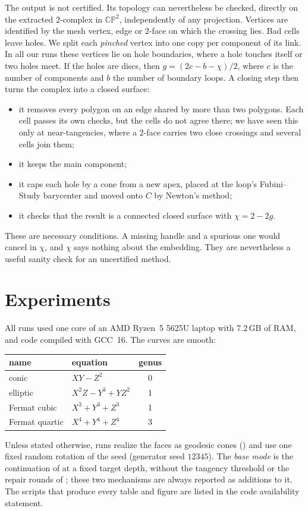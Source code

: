 \documentclass[11pt]{article}
\theoremstyle{plain}
\theoremstyle{definition}
\theoremstyle{remark}
\newcommand{\CP}{\mathbb{CP}}
\begin{document}
The output is not certified. Its topology can nevertheless be checked,
directly on the extracted $2$-complex in $\CP^2$, independently of any
projection. Vertices are identified by the mesh vertex, edge or $2$-face
on which the crossing lies. Bad cells leave holes. We split each
\emph{pinched} vertex into one copy per component of its link. In all our
runs these vertices lie on hole boundaries, where a hole touches itself
or two holes meet. If the holes are discs, then
$g=(2c-b-\chi)/2$, where $c$ is the number of components and $b$ the number
of boundary loops. A closing step then turns the complex into a closed
surface:
\begin{itemize}[itemsep=1pt]
\item it removes every polygon on an edge shared by more than two
  polygons. Each cell passes its own checks, but the cells do not agree
  there; we have seen this only at near-tangencies, where a $2$-face
  carries two close crossings and several cells join them;
\item it keeps the main component;
\item it caps each hole by a cone from a new apex, placed at the loop's
  Fubini--Study barycenter and moved onto $C$ by Newton's method;
\item it checks that the result is a connected closed surface with
  $\chi=2-2g$.
\end{itemize}
These are necessary conditions. A missing handle and a spurious one would
cancel in $\chi$, and $\chi$ says nothing about the embedding. They are
nevertheless a useful sanity check for an uncertified method.

\section{Experiments}
\label{sec:experiments}

All runs used one core of an AMD Ryzen~5 5625U laptop with $7.2$\,GB of
RAM, and code compiled with GCC~16. The curves are smooth:
\begin{center}
\small
\begin{tabular}{@{}llc@{}}
\toprule
name & equation & genus \\
\midrule
conic & $XY-Z^2$ & 0 \\
elliptic & $X^2Z-Y^3+YZ^2$ & 1 \\
Fermat cubic & $X^3+Y^3+Z^3$ & 1 \\
Fermat quartic & $X^4+Y^4+Z^4$ & 3 \\
\bottomrule
\end{tabular}
\end{center}
Unless stated otherwise, runs realize the faces as geodesic cones
() and use one fixed random rotation of the seed
(generator seed $12345$). The \emph{base mode} is the continuation of
 at a fixed target depth, without the tangency
threshold or the repair rounds of ; these two
mechanisms are always reported as additions to it. The scripts that produce
every table and figure are listed in the code availability statement.
\end{document}
